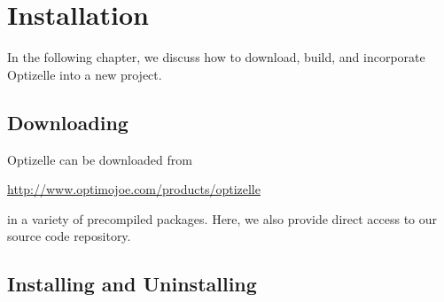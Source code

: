 \documentclass{report}
\begin{document}
\chapter{Installation}\label{ch:Install}

        In the following chapter, we discuss how to download, build, and incorporate Optizelle into a new project.

\section{Downloading}

        Optizelle can be downloaded from
\begin{center}
    \mbox{\url{http://www.optimojoe.com/products/optizelle}}
\end{center}
in a variety of precompiled packages.  Here, we also provide direct access to our source code repository.

\section{Installing and Uninstalling}
\end{document}
